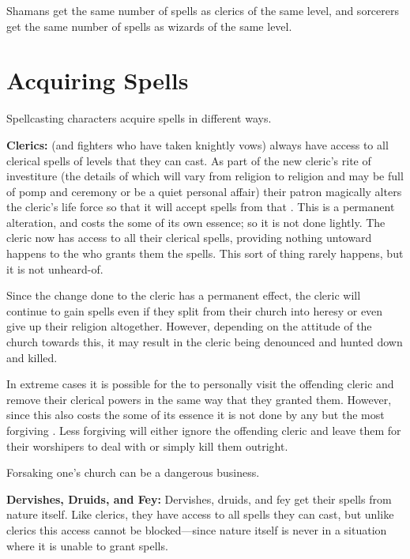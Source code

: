 \begin{multicols*}{2}
Shamans get the same number of spells as clerics of the same level, and sorcerers get the same number of spells as wizards of the same level.

\section{Acquiring Spells}
Spellcasting characters acquire spells in different ways.

\textbf{Clerics:}  (and fighters who have taken knightly vows) always have access to all clerical spells of levels that they can cast. As part of the new cleric’s rite of investiture (the details of which will vary from religion to religion and may be full of pomp and ceremony or be a quiet personal affair) their patron  magically alters the cleric’s life force so that it will accept spells from that . This is a permanent alteration, and costs the  some of its own essence; so it is not done lightly. The cleric now has access to all their clerical spells, providing nothing untoward happens to the  who grants them the spells. This sort of thing rarely happens, but it is not unheard-of.

Since the change done to the cleric has a permanent effect, the cleric will continue to gain spells even if they split from their church into heresy or even give up their religion altogether. However, depending on the attitude of the church towards this, it may result in the cleric being denounced and hunted down and killed.

In extreme cases it is possible for the  to personally visit the offending cleric and remove their clerical powers in the same way that they granted them. However, since this also costs the  some of its essence it is not done by any but the most forgiving . Less forgiving  will either ignore the offending cleric and leave them for their worshipers to deal with or simply kill them outright.

Forsaking one’s church can be a dangerous business.

\textbf{Dervishes, Druids, and Fey:} Dervishes, druids, and fey get their spells from nature itself. Like clerics, they have access to all spells they can cast, but unlike clerics this access cannot be blocked—since nature itself is never in a situation where it is unable to grant spells.


\end{multicols*}
